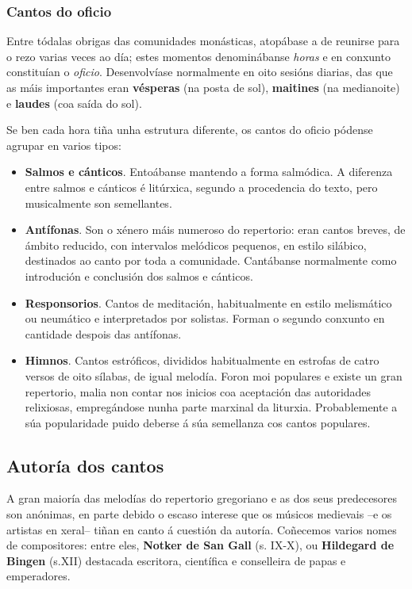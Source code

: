 \documentclass[a4paper, twoside]{templates/ociamthesis}
\begin{document}
\hypertarget{cantos-do-oficio}{%
\subsubsection{Cantos do oficio}\label{cantos-do-oficio}}

Entre tódalas obrigas das comunidades monásticas, atopábase a de reunirse para o rezo varias veces ao día; estes momentos denominábanse \emph{horas} e en conxunto constituían o \emph{oficio}. Desenvolvíase normalmente en oito sesións diarias, das que as máis importantes eran \textbf{vésperas} (na posta de sol), \textbf{maitines} (na medianoite) e \textbf{laudes} (coa saída do sol).

Se ben cada hora tiña unha estrutura diferente, os cantos do oficio pódense agrupar en varios tipos:

\begin{itemize}
\item
  \textbf{Salmos e cánticos}. Entoábanse mantendo a forma salmódica. A diferenza entre salmos e cánticos é litúrxica, segundo a procedencia do texto, pero musicalmente son semellantes.
\item
  \textbf{Antífonas}. Son o xénero máis numeroso do repertorio: eran cantos breves, de ámbito reducido, con intervalos melódicos pequenos, en estilo silábico, destinados ao canto por toda a comunidade. Cantábanse normalmente como introdución e conclusión dos salmos e cánticos.
\item
  \textbf{Responsorios}. Cantos de meditación, habitualmente en estilo melismático ou neumático e interpretados por solistas. Forman o segundo conxunto en cantidade despois das antífonas.
\item
  \textbf{Himnos}. Cantos estróficos, divididos habitualmente en estrofas de catro versos de oito sílabas, de igual melodía. Foron moi populares e existe un gran repertorio, malia non contar nos inicios coa aceptación das autoridades relixiosas, empregándose nunha parte marxinal da liturxia. Probablemente a súa popularidade puido deberse á súa semellanza cos cantos populares.
\end{itemize}

\hypertarget{autoruxeda-dos-cantos}{%
\subsection{Autoría dos cantos}\label{autoruxeda-dos-cantos}}

A gran maioría das melodías do repertorio gregoriano e as dos seus predecesores son anónimas, en parte debido o escaso interese que os músicos medievais --e os artistas en xeral-- tiñan en canto á cuestión da autoría. Coñecemos varios nomes de compositores: entre eles, \textbf{Notker de San Gall} (s. IX-X), ou \textbf{Hildegard de Bingen} (s.XII) destacada escritora, científica e conselleira de papas e emperadores.
\end{document}

